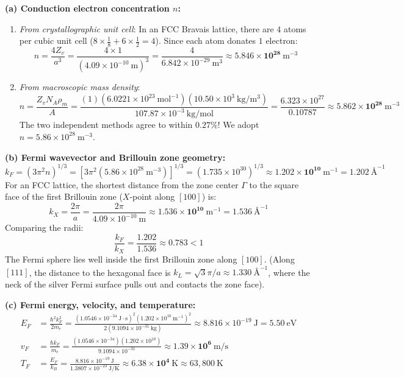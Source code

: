 \documentclass[11pt,a4paper]{article}
\begin{document}
\textbf{(a) Conduction electron concentration $n$:}
\begin{enumerate}[label=(\roman*)]
    \item \emph{From crystallographic unit cell}: In an FCC Bravais lattice, there are $4$ atoms per cubic unit cell ($8 \times \frac{1}{8} + 6 \times \frac{1}{2} = 4$). Since each atom donates $1$ electron:
    \[
    n = \frac{4 Z_v}{a^3} = \frac{4 \times 1}{(4.09 \times 10^{-10}\ \mathrm{m})^3} = \frac{4}{6.842 \times 10^{-29}\ \mathrm{m^3}} \approx \mathbf{5.846 \times 10^{28}\ \mathrm{m^{-3}}}
    \]
    \item \emph{From macroscopic mass density}:
    \[
    n = \frac{Z_v N_A \rho_m}{A} = \frac{(1)(6.0221 \times 10^{23}\ \mathrm{mol^{-1}})(10.50 \times 10^3\ \mathrm{kg/m^3})}{107.87 \times 10^{-3}\ \mathrm{kg/mol}} = \frac{6.323 \times 10^{27}}{0.10787} \approx \mathbf{5.862 \times 10^{28}\ \mathrm{m^{-3}}}
    \]
    The two independent methods agree to within $0.27\%$! We adopt $n = 5.86 \times 10^{28}\ \mathrm{m^{-3}}$.
\end{enumerate}

\textbf{(b) Fermi wavevector and Brillouin zone geometry:}
\[
k_F = (3\pi^2 n)^{1/3} = \left[ 3\pi^2 (5.86 \times 10^{28}\ \mathrm{m^{-3}}) \right]^{1/3} = (1.735 \times 10^{30})^{1/3} \approx \mathbf{1.202 \times 10^{10}\ \mathrm{m^{-1}}} = 1.202\ \text{\AA}^{-1}
\]
For an FCC lattice, the shortest distance from the zone center $\Gamma$ to the square face of the first Brillouin zone ($X$-point along $[100]$) is:
\[
k_X = \frac{2\pi}{a} = \frac{2\pi}{4.09 \times 10^{-10}\ \mathrm{m}} \approx \mathbf{1.536 \times 10^{10}\ \mathrm{m^{-1}}} = 1.536\ \text{\AA}^{-1}
\]
Comparing the radii:
\[
\frac{k_F}{k_X} = \frac{1.202}{1.536} \approx 0.783 < 1
\]
The Fermi sphere lies well inside the first Brillouin zone along $[100]$. (Along $[111]$, the distance to the hexagonal face is $k_L = \sqrt{3}\pi/a \approx 1.330\ \text{\AA}^{-1}$, where the neck of the silver Fermi surface pulls out and contacts the zone face).

\textbf{(c) Fermi energy, velocity, and temperature:}
\begin{align*}
E_F &= \frac{\hbar^2 k_F^2}{2m_e} = \frac{(1.0546 \times 10^{-34}\ \mathrm{J\cdot s})^2 (1.202 \times 10^{10}\ \mathrm{m^{-1}})^2}{2(9.1094 \times 10^{-31}\ \mathrm{kg})} \approx 8.816 \times 10^{-19}\ \mathrm{J} = \mathbf{5.50\ \mathrm{eV}} \\
v_F &= \frac{\hbar k_F}{m_e} = \frac{(1.0546 \times 10^{-34})(1.202 \times 10^{10})}{9.1094 \times 10^{-31}} \approx \mathbf{1.39 \times 10^6\ \mathrm{m/s}} \\
T_F &= \frac{E_F}{k_B} = \frac{8.816 \times 10^{-19}\ \mathrm{J}}{1.3807 \times 10^{-23}\ \mathrm{J/K}} \approx \mathbf{6.38 \times 10^4\ \mathrm{K}} \approx 63{,}800\ \mathrm{K}
\end{align*}
\end{document}
